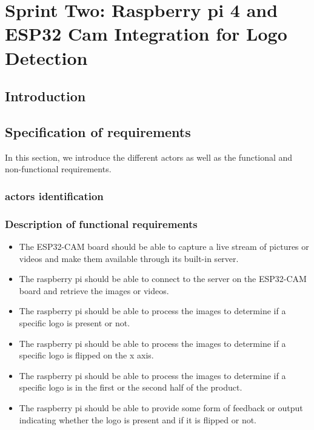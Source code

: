 %



%



\chapter{Sprint Two: Raspberry pi 4 and ESP32 Cam Integration for Logo Detection}
\section*{Introduction}
\section{Specification of requirements}
In this section, we introduce the different actors as well as the functional and non-functional requirements.
\subsection{actors identification }
\subsection{Description of functional requirements}
\begin{itemize}
\item The ESP32-CAM board should be able to capture a live stream of pictures or videos and make them available through its built-in server.
\item The raspberry pi should be able to connect to the server on the ESP32-CAM board and retrieve the images or videos.
\item The raspberry pi should be able to process the images to determine if a specific logo is present or not.
\item The raspberry pi should be able to process the images to determine if a specific logo is flipped on the x axis.
\item The raspberry pi should be able to process the images to determine if a specific logo is in the first or the second half of the product.
\item The raspberry pi should be able to provide some form of feedback or output indicating whether the logo is present and if it is flipped or not.
\end{itemize}

